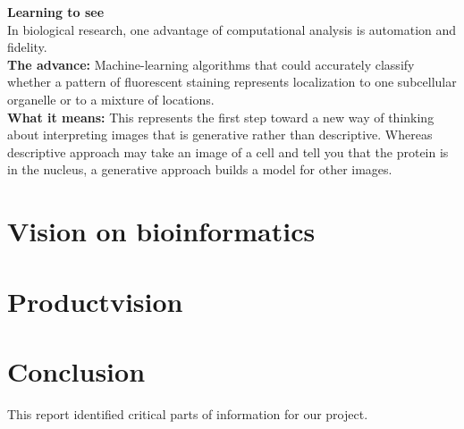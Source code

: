 \documentclass[10pt,a4paper]{report}
\begin{document}
\textbf{Learning to see}\\
In biological research, one advantage of computational analysis is automation and fidelity.\\
\textbf{The advance:} Machine-learning algorithms that could accurately classify whether a pattern of fluorescent staining represents localization to one subcellular organelle or to a mixture of locations.\\
\textbf{What it means:} This represents the first step toward a new way of thinking about interpreting images that is generative rather than descriptive.
Whereas descriptive approach may take an image of a cell and tell you that the protein is in the nucleus, a generative approach builds a model for other images.
\newpage
\section*{Vision on bioinformatics}
\section*{Productvision}
\section*{Conclusion}
This report identified critical parts of information for our project. 
\end{document}
